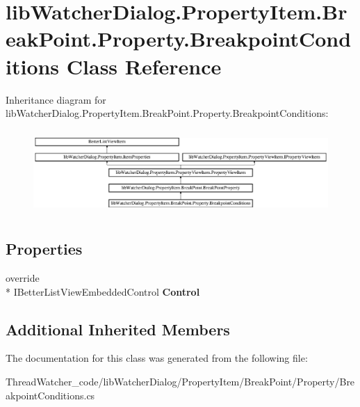 \hypertarget{classlib_watcher_dialog_1_1_property_item_1_1_break_point_1_1_property_1_1_breakpoint_conditions}{\section{lib\+Watcher\+Dialog.\+Property\+Item.\+Break\+Point.\+Property.\+Breakpoint\+Conditions Class Reference}
\label{classlib_watcher_dialog_1_1_property_item_1_1_break_point_1_1_property_1_1_breakpoint_conditions}
}
Inheritance diagram for lib\+Watcher\+Dialog.\+Property\+Item.\+Break\+Point.\+Property.\+Breakpoint\+Conditions\+:\begin{figure}[H]
\begin{center}
\leavevmode
\includegraphics[height=3.240741cm]{classlib_watcher_dialog_1_1_property_item_1_1_break_point_1_1_property_1_1_breakpoint_conditions}
\end{center}
\end{figure}
\subsection*{Properties}
\begin{DoxyCompactItemize}
\item 
\hypertarget{classlib_watcher_dialog_1_1_property_item_1_1_break_point_1_1_property_1_1_breakpoint_conditions_a7ac15ccf7f5d0be3a7497738accef55c}{override \\*
I\+Better\+List\+View\+Embedded\+Control {\bfseries Control}}\label{classlib_watcher_dialog_1_1_property_item_1_1_break_point_1_1_property_1_1_breakpoint_conditions_a7ac15ccf7f5d0be3a7497738accef55c}

\end{DoxyCompactItemize}
\subsection*{Additional Inherited Members}


The documentation for this class was generated from the following file\+:\begin{DoxyCompactItemize}
\item 
Thread\+Watcher\+\_\+code/lib\+Watcher\+Dialog/\+Property\+Item/\+Break\+Point/\+Property/Breakpoint\+Conditions.\+cs\end{DoxyCompactItemize}
